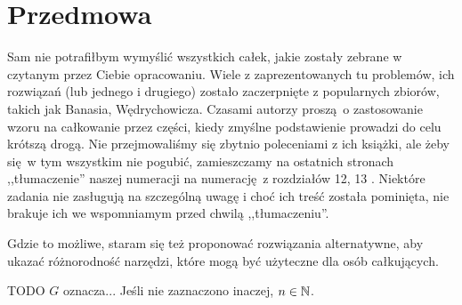 

\tableofcontents

\chapter*{Przedmowa}
Sam nie potrafiłbym wymyślić wszystkich całek, jakie zostały zebrane w czytanym przez Ciebie opracowaniu.
Wiele z zaprezentowanych tu problemów, ich rozwiązań (lub jednego i drugiego) zostało zaczerpnięte z popularnych zbiorów, takich jak \cite{wedrychowicz12} Banasia, Wędrychowicza.
Czasami autorzy proszą o zastosowanie wzoru na całkowanie przez części, kiedy zmyślne podstawienie prowadzi do celu krótszą drogą.
Nie przejmowaliśmy się zbytnio poleceniami z ich książki, ale żeby się w tym wszystkim nie pogubić, zamieszczamy na ostatnich stronach ,,tłumaczenie'' naszej numeracji na numerację z rozdziałów 12, 13 \cite{wedrychowicz12}.
Niektóre zadania nie zasługują na szczególną uwagę i choć ich treść została pominięta, nie brakuje ich we wspomniamym przed chwilą ,,tłumaczeniu''.

Gdzie to możliwe, staram się też proponować rozwiązania alternatywne, aby ukazać różnorodność narzędzi, które mogą być użyteczne dla osób całkujących.

TODO
$G$ oznacza...
Jeśli nie zaznaczono inaczej, $n \in {\mathbb N}$.


